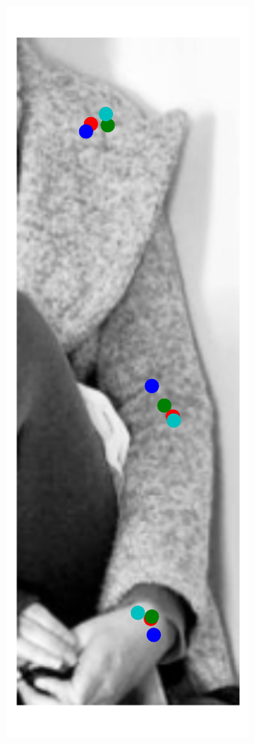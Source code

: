 \begin{figure}[t!]
\begin{subfigure}[b]{0.05\textwidth}
    \end{subfigure}
  	\hfill
    \begin{subfigure}[b]{0.05\textwidth}
            \includegraphics[width=\textwidth]{resources/Fig_Variance/image_5}

\end{subfigure}
\end{figure}
